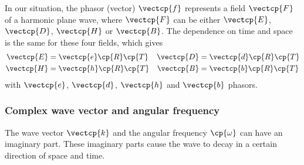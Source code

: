 \begin{refsection}
In our situation, the phasor (vector) $\vectcp{f}$ represents a field $\vectcp{F}$ of a harmonic plane wave, where $\vectcp{F}$ can be either $\vectcp{E}$, $\vectcp{D}$, $\vectcp{H}$ or $\vectcp{B}$.
The dependence on time and space is the same for these four fields, which gives
\begin{equation}
    \begin{aligned}
        \vectcp{E} &= \vectcp{e} \cp{R}\cp{T}
        &
        \vectcp{D} &= \vectcp{d} \cp{R}\cp{T}
        \\
        \vectcp{H} &= \vectcp{h} \cp{R}\cp{T}
        &
        \vectcp{B} &= \vectcp{b} \cp{R}\cp{T}
    \end{aligned}
    \label{eq:harmonic_plane_fields}
\end{equation}
with $\vectcp{e}$, $\vectcp{d}$, $\vectcp{h}$ and $\vectcp{b}$ phasors.

\subsubsection{Complex wave vector and angular frequency}
\label{sec:complex_k_omega}
The wave vector $\vectcp{k}$ and the angular frequency $\cp{\omega}$ can have an imaginary part.
These imaginary parts cause the wave to decay in a certain direction of space and time.


\end{refsection}
